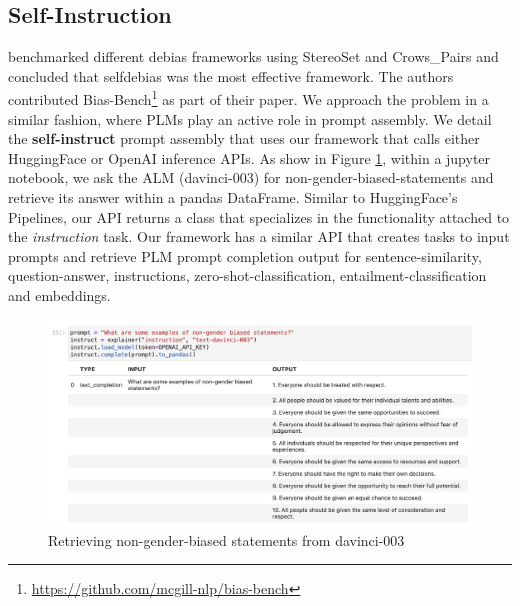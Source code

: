 \documentclass[11pt]{article}
\begin{document}
\onecolumn
\begin{appendices}


\section{Self-Instruction}\label{appendix:self instruction pipeline}

\citealp{meade_2022_empirical:22} benchmarked different debias frameworks using StereoSet and Crows\_Pairs and concluded that self\textendash debias \citep{schick2021self:21} was the most effective framework. The authors contributed Bias-Bench\footnote{\url{https://github.com/mcgill-nlp/bias-bench}} as part of their paper. We approach the problem in a similar fashion, where PLMs play an active role in prompt assembly. We detail the \textbf{self-instruct} prompt assembly that uses our framework that calls either HuggingFace or OpenAI inference APIs. As show in Figure \ref{fig:nongenderbiasedstatements}, within a jupyter notebook, we ask the ALM (davinci-003) for non-gender-biased-statements and retrieve its answer within a pandas DataFrame. Similar to HuggingFace's Pipelines, our API returns a class that specializes in the functionality attached to the \emph{instruction} task. Our framework has a similar API that creates tasks to input prompts and retrieve PLM prompt completion output for sentence-similarity, question-answer, instructions, zero-shot-classification, entailment-classification and embeddings. 

\begin{figure}[H]
  \includegraphics[width=\linewidth]{img/non-gender-biased-statements.png}
  \caption{Retrieving non-gender-biased statements from davinci-003}
  \label{fig:nongenderbiasedstatements}
\end{figure}


\end{appendices}
\end{document}
